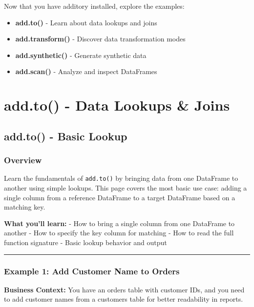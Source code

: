 \documentclass[
  letterpaper,
]{scrbook}
\providecommand{\tightlist}{%
  \setlength{\itemsep}{0pt}\setlength{\parskip}{0pt}}
\begin{document}
Now that you have additory installed, explore the examples:

\begin{itemize}
\tightlist
\item
  \textbf{add.to()} - Learn about data lookups and joins
\item
  \textbf{add.transform()} - Discover data transformation modes
\item
  \textbf{add.synthetic()} - Generate synthetic data
\item
  \textbf{add.scan()} - Analyze and inspect DataFrames
\end{itemize}

\part{add.to() - Data Lookups \& Joins}

\chapter{add.to() - Basic Lookup}\label{add.to---basic-lookup}

\section{Overview}\label{overview}

Learn the fundamentals of \texttt{add.to()} by bringing data from one
DataFrame to another using simple lookups. This page covers the most
basic use case: adding a single column from a reference DataFrame to a
target DataFrame based on a matching key.

\textbf{What you'll learn:} - How to bring a single column from one
DataFrame to another - How to specify the key column for matching - How
to read the full function signature - Basic lookup behavior and output

\begin{center}\rule{0.5\linewidth}{0.5pt}\end{center}

\section{Example 1: Add Customer Name to
Orders}\label{example-1-add-customer-name-to-orders}

\textbf{Business Context:} You have an orders table with customer IDs,
and you need to add customer names from a customers table for better
readability in reports.
\end{document}
